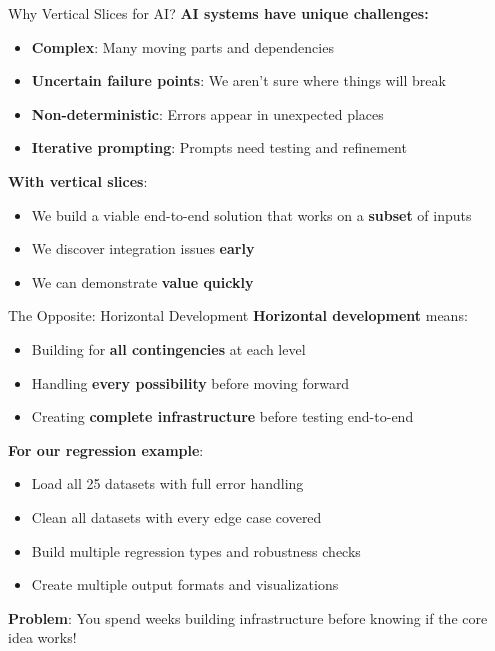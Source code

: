 \documentclass[aspectratio=169]{beamer}
\begin{document}
\begin{frame}{Why Vertical Slices for AI?}
\textbf{AI systems have unique challenges:}
\begin{itemize}
    \item \textbf{Complex}: Many moving parts and dependencies
    \item \textbf{Uncertain failure points}: We aren't sure where things will break
    \item \textbf{Non-deterministic}: Errors appear in unexpected places
    \item \textbf{Iterative prompting}: Prompts need testing and refinement
\end{itemize}
\vspace{0.3cm}

\textbf{With vertical slices}:
\begin{itemize}
    \item We build a viable end-to-end solution that works on a \textbf{subset} of inputs
    \item We discover integration issues \textbf{early}
    \item We can demonstrate \textbf{value quickly}
\end{itemize}
\end{frame}

\begin{frame}{The Opposite: Horizontal Development}
\textbf{Horizontal development} means:
\begin{itemize}
    \item Building for \textbf{all contingencies} at each level
    \item Handling \textbf{every possibility} before moving forward
    \item Creating \textbf{complete infrastructure} before testing end-to-end
\end{itemize}
\vspace{0.3cm}

\textbf{For our regression example}:
\begin{itemize}
    \item Load all 25 datasets with full error handling
    \item Clean all datasets with every edge case covered
    \item Build multiple regression types and robustness checks
    \item Create multiple output formats and visualizations
\end{itemize}
\vspace{0.3cm}

\textbf{Problem}: You spend weeks building infrastructure before knowing if the core idea works!
\end{frame}
\end{document}
